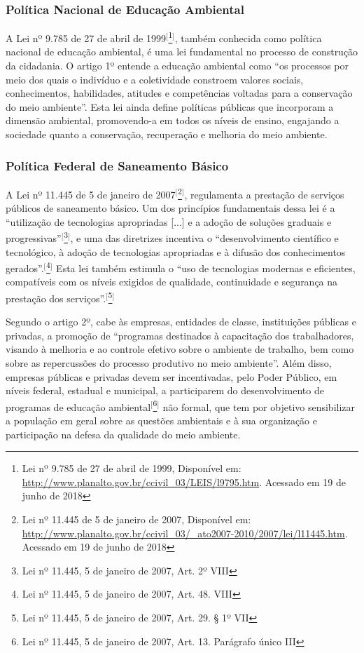 \subsubsection{Política Nacional de Educação Ambiental} 

A Lei nº 9.785 de 27 de abril de 1999$^{[}$\footnote{Lei nº 9.785 de 27 de abril de 1999, Disponível em: \url{http://www.planalto.gov.br/ccivil_03/LEIS/l9795.htm}. Acessado em 19 de junho de 2018}$^{]}$, também conhecida como política nacional de educação ambiental, é uma lei fundamental no processo de construção da cidadania. O artigo 1º entende a educação ambiental como ``os processos por meio dos quais o indivíduo e a coletividade constroem valores sociais, conhecimentos, habilidades, atitudes e competências voltadas para a conservação do meio ambiente''. Esta lei ainda define políticas públicas que incorporam a dimensão  ambiental, promovendo-a em todos os níveis de ensino, engajando a sociedade quanto a conservação, recuperação e melhoria do meio ambiente.

\subsubsection{Política Federal de Saneamento Básico}

A Lei nº 11.445 de 5 de janeiro de 2007$^{[}$\footnote{Lei nº 11.445 de 5 de janeiro de 2007, Disponível em: \url{http://www.planalto.gov.br/ccivil_03/_ato2007-2010/2007/lei/l11445.htm}. Acessado em 19 de junho de 2018}$^{]}$, regulamenta a prestação de serviços públicos de saneamento básico. Um dos princípios fundamentais dessa lei é a ``utilização de tecnologias apropriadas [...] e a adoção de soluções graduais e progressivas''$^{[}$\footnote{Lei nº 11.445, 5 de janeiro de 2007, Art. 2º VIII}$^{]}$, e uma das diretrizes incentiva o ``desenvolvimento científico e tecnológico, à adoção de tecnologias apropriadas e à difusão dos conhecimentos gerados''.$^{[}$\footnote{Lei nº 11.445, 5 de janeiro de 2007, Art. 48. VIII}$^{]}$ Esta lei também estimula o ``uso de tecnologias modernas e eficientes, compatíveis com os níveis exigidos de qualidade, continuidade e segurança na prestação dos serviços''.$^{[}$\footnote{Lei nº 11.445, 5 de janeiro de 2007, Art. 29.  § 1º  VII}$^{]}$

Segundo o artigo 2º, cabe às empresas, entidades de classe, instituições públicas e privadas, a promoção de ``programas destinados à capacitação dos trabalhadores, visando à melhoria e ao controle efetivo sobre o ambiente de trabalho, bem como sobre as repercussões do processo produtivo no meio ambiente''. Além disso, empresas públicas e privadas devem ser incentivadas, pelo Poder Público, em níveis federal, estadual e municipal, a participarem do desenvolvimento de programas de educação ambiental$^{[}$\footnote{Lei nº 11.445, 5 de janeiro de 2007, Art. 13. Parágrafo único III}$^{]}$ não formal, que tem por objetivo sensibilizar a população em geral sobre as questões ambientais e à sua organização e participação na defesa da qualidade do meio ambiente.

